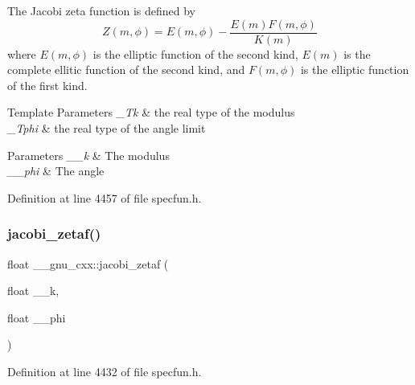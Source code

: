 The Jacobi zeta function is defined by \[ Z(m,\phi) = E(m,\phi) - \frac{E(m)F(m,\phi)}{K(m)} \] where $ E(m,\phi) $ is the elliptic function of the second kind, $ E(m) $ is the complete ellitic function of the second kind, and $ F(m,\phi) $ is the elliptic function of the first kind.


\begin{DoxyTemplParams}{Template Parameters}
{\em \+\_\+\+Tk} & the real type of the modulus \\
\hline
{\em \+\_\+\+Tphi} & the real type of the angle limit \\
\hline
\end{DoxyTemplParams}

\begin{DoxyParams}{Parameters}
{\em \+\_\+\+\_\+k} & The modulus \\
\hline
{\em \+\_\+\+\_\+phi} & The angle \\
\hline
\end{DoxyParams}


Definition at line 4457 of file specfun.\+h.

\mbox{\label{group__gnu__math__spec__func_gaedb6b352331c67b9dea73660e2045668}} 
\subsubsection{\texorpdfstring{jacobi\+\_\+zetaf()}{jacobi\_zetaf()}}
{\footnotesize\ttfamily float \+\_\+\+\_\+gnu\+\_\+cxx\+::jacobi\+\_\+zetaf (\begin{DoxyParamCaption}\item[{float}]{\+\_\+\+\_\+k,  }\item[{float}]{\+\_\+\+\_\+phi }\end{DoxyParamCaption})\hspace{0.3cm}{\ttfamily [inline]}}



Definition at line 4432 of file specfun.\+h.

\mbox{\label{group__gnu__math__spec__func_ga9db158df9459aa12c840724338753913}} 
